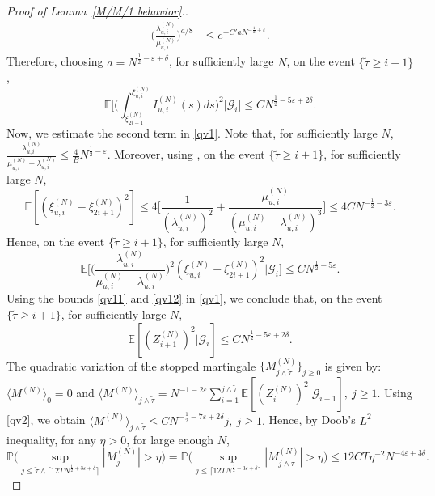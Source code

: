 \documentclass[11pt, reqno]{article}
\numberwithin{equation}{section}
\numberwithin{theorem}{section}
\begin{document}
\begin{appendix}
\begin{proof}[Proof of Lemma~\ref{M/M/1 behavior}.]
\begin{align*}
\bigg(\frac{\lambda^{(N)}_{u,i}}{\mu^{(N)}_{u,i}}\bigg)^{a/8} &\le e^{-C' a N^{-\frac{1}{2} + \varepsilon}}.
\end{align*}
Therefore, choosing $a =  N^{\frac{1}{2} - \varepsilon + \delta}$, for sufficiently large $N$, on the event $\{\tilde \tau \ge i+1\}$,
\begin{equation}\label{qv11}
\mathbb{E}\bigg[\bigg(\int_{\xi^{(N)}_{2i+1}}^{\xi^{(N)}_{u,i}}I^{(N)}_{u,i}(s)ds\bigg)^2 \Big| \mathcal{G}_{i}\bigg] \le CN^{\frac{1}{2} - 5\varepsilon + 2\delta}.
\end{equation}
Now, we estimate the second term in \eqref{qv1}. Note that, for sufficiently large $N$, 
$
\frac{\lambda^{(N)}_{u,i}}{\mu^{(N)}_{u,i}-\lambda^{(N)}_{u,i}} \le \frac{4}{B}N^{\frac{1}{2} - \varepsilon}.
$
Moreover, using \cite[Section 7.9, Page 75]{adan2017queueing}, on the event $\{\tilde \tau \ge i+1\}$, for sufficiently large $N$,
$$
\mathbb{E}\left[\left(\xi^{(N)}_{u,i} - \xi^{(N)}_{2i+1}\right)^2\right]  \le 4\bigg[\frac{1}{\left(\lambda^{(N)}_{u,i}\right)^2} + \frac{\mu^{(N)}_{u,i}}{(\mu^{(N)}_{u,i} - \lambda^{(N)}_{u,i})^3}\bigg] \le 4C N^{-\frac{1}{2} - 3\varepsilon}.
$$
Hence, on the event $\{\tilde \tau \ge i+1\}$, for sufficiently large $N$,
\begin{equation}\label{qv12}
\mathbb{E}\bigg[\bigg(\frac{\lambda^{(N)}_{u,i}}{\mu^{(N)}_{u,i}-\lambda^{(N)}_{u,i}}\bigg)^2\left(\xi^{(N)}_{u,i} - \xi^{(N)}_{2i+1}\right)^2 \Big| \mathcal{G}_{i}\bigg] \le C N^{\frac{1}{2} -5\varepsilon}.
\end{equation}
Using the bounds \eqref{qv11} and \eqref{qv12} in \eqref{qv1}, we conclude that, on the event $\{\tilde \tau \ge i+1\}$, for sufficiently large $N$,
\begin{equation}\label{qv2}
\mathbb{E}\left[(Z^{(N)}_{i+1})^2 \vert \mathcal{G}_{i}\right] \le CN^{\frac{1}{2} - 5\varepsilon + 2\delta}.
\end{equation}
The quadratic variation of the stopped martingale $\{M^{(N)}_{j \wedge \tilde \tau}\}_{j \ge 0}$ is given by: $\langle M^{(N)}\rangle_{0} = 0$ and
$
\langle M^{(N)}\rangle_{j\wedge \tilde \tau} = N^{-1 - 2\varepsilon}\sum_{i=1}^{j \wedge \tilde \tau}\mathbb{E}\left[(Z^{(N)}_{i})^2 \vert \mathcal{G}_{i-1}\right], \  j \ge 1.
$
Using \eqref{qv2}, we obtain
$
\langle M^{(N)}\rangle_{j\wedge \tilde \tau} \le CN^{-\frac{1}{2} - 7\varepsilon + 2\delta} j, \ j \ge  1.
$
Hence, by Doob's $L^2$ inequality, for any $\eta>0$, for large enough $N$,
\begin{equation}\label{qv3}
\mathbb{P}\bigg(\sup_{j \le \tilde \tau \wedge \lceil 12TN^{\frac{1}{2}+3\varepsilon+\delta}\rceil} \left|M^{(N)}_j\right|  > \eta\bigg) = \mathbb{P}\bigg(\sup_{j \le \lceil 12TN^{\frac{1}{2}+3\varepsilon+\delta}\rceil} \left|M^{(N)}_{j \wedge \tilde \tau}\right|  > \eta\bigg)  \le 12CT\eta^{-2} N^{ - 4\varepsilon + 3\delta}.

\end{equation}
\end{proof}
\end{appendix}
\end{document}
